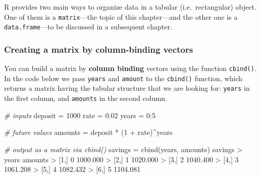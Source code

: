 \documentclass[
]{book}
\newenvironment{Shaded}{\begin{snugshade}}{\end{snugshade}}
\newcommand{\CommentTok}[1]{\textcolor[rgb]{0.56,0.35,0.01}{\textit{#1}}}
\newcommand{\DecValTok}[1]{\textcolor[rgb]{0.00,0.00,0.81}{#1}}
\newcommand{\FloatTok}[1]{\textcolor[rgb]{0.00,0.00,0.81}{#1}}
\newcommand{\FunctionTok}[1]{\textcolor[rgb]{0.00,0.00,0.00}{#1}}
\newcommand{\NormalTok}[1]{#1}
\newcommand{\OtherTok}[1]{\textcolor[rgb]{0.56,0.35,0.01}{#1}}
\newcommand{\SpecialCharTok}[1]{\textcolor[rgb]{0.00,0.00,0.00}{#1}}
\begin{document}
R provides two main ways to organize data in a tabular (i.e.~rectangular)
object. One of them is a \texttt{matrix}---the topic of this chapter---and the other
one is a \texttt{data.frame}---to be discussed in a subsequent chapter.

\hypertarget{creating-a-matrix-by-column-binding-vectors}{%
\subsubsection*{Creating a matrix by column-binding vectors}\label{creating-a-matrix-by-column-binding-vectors}}

You can build a matrix by \textbf{column binding} vectors using the function
\texttt{cbind()}. In the code below we pass \texttt{years} and \texttt{amount} to the \texttt{cbind()}
function, which returns a matrix having the tabular structure that we are
looking for: \texttt{years} in the first column, and \texttt{amounts} in the second column.

\begin{Shaded}
\begin{Highlighting}[]
\CommentTok{\# inputs}
\NormalTok{deposit }\OtherTok{=} \DecValTok{1000}
\NormalTok{rate }\OtherTok{=} \FloatTok{0.02}
\NormalTok{years }\OtherTok{=} \DecValTok{0}\SpecialCharTok{:}\DecValTok{5}

\CommentTok{\# future values}
\NormalTok{amounts }\OtherTok{=}\NormalTok{ deposit }\SpecialCharTok{*}\NormalTok{ (}\DecValTok{1} \SpecialCharTok{+}\NormalTok{ rate)}\SpecialCharTok{\^{}}\NormalTok{years}

\CommentTok{\# output as a matrix via cbind()}
\NormalTok{savings }\OtherTok{=} \FunctionTok{cbind}\NormalTok{(years, amounts)}
\NormalTok{savings}
\SpecialCharTok{\textgreater{}}\NormalTok{      years  amounts}
\SpecialCharTok{\textgreater{}}\NormalTok{ [}\DecValTok{1}\NormalTok{,]     }\DecValTok{0} \FloatTok{1000.000}
\SpecialCharTok{\textgreater{}}\NormalTok{ [}\DecValTok{2}\NormalTok{,]     }\DecValTok{1} \FloatTok{1020.000}
\SpecialCharTok{\textgreater{}}\NormalTok{ [}\DecValTok{3}\NormalTok{,]     }\DecValTok{2} \FloatTok{1040.400}
\SpecialCharTok{\textgreater{}}\NormalTok{ [}\DecValTok{4}\NormalTok{,]     }\DecValTok{3} \FloatTok{1061.208}
\SpecialCharTok{\textgreater{}}\NormalTok{ [}\DecValTok{5}\NormalTok{,]     }\DecValTok{4} \FloatTok{1082.432}
\SpecialCharTok{\textgreater{}}\NormalTok{ [}\DecValTok{6}\NormalTok{,]     }\DecValTok{5} \FloatTok{1104.081}
\end{Highlighting}
\end{Shaded}
\end{document}
